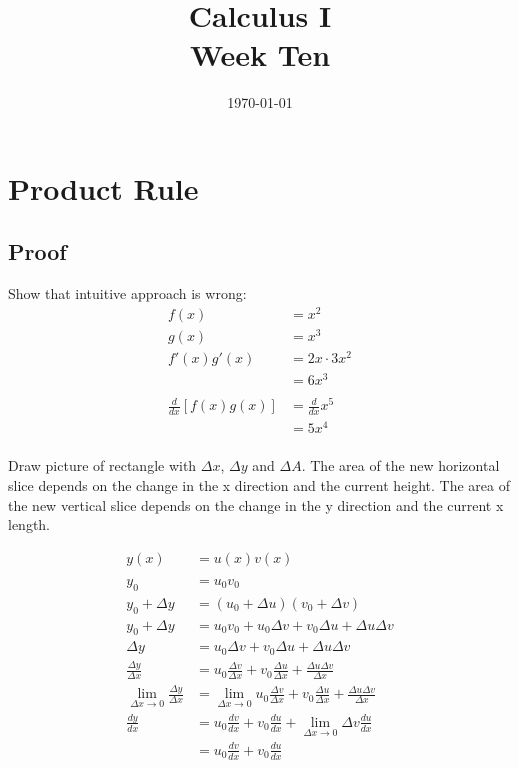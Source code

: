 \documentclass[letterpaper, landscape]{exam}
\title{Calculus I \\ Week Ten}
\author{}
\date{\today}
\begin{document}
  \maketitle
  \tableofcontents

  \section{Product Rule} %
  \label{sec:pr}
  
  \subsection{Proof} %
  \label{sub:pr.proof}
  
  Show that intuitive approach is wrong:
  \begin{align*}
    f(x)                       & = x^2 \\
    g(x)                       & = x^3 \\
    f'(x) g'(x)                & = 2x \cdot 3x^2 \\
                               & = 6x^3 \\
    \\
    \frac{d}{dx} [ f(x) g(x) ] & = \frac{d}{dx} x^5 \\
                               & = 5x^4 \\
  \end{align*}

  Draw picture of rectangle with $\Delta x$, $\Delta y$ and $\Delta A$. The area of the new
  horizontal slice depends on the change in the x direction and the current height. The area of the
  new vertical slice depends on the change in the y direction and the current x length.

  \begin{align*}
    y(x)                      & = u(x) v(x) \\
    \\
    y_0                       & = u_0 v_0 \\
    y_0 + \Delta y            & = (u_0 + \Delta u) (v_0 + \Delta v) \\
    y_0 + \Delta y            & = u_0 v_0 + u_0 \Delta v + v_0 \Delta u + \Delta u \Delta v \\
    \Delta y                  & = u_0 \Delta v + v_0 \Delta u + \Delta u \Delta v \\
    \frac{\Delta y}{\Delta x} & = u_0 \frac{\Delta v}{\Delta x} + v_0 \frac{\Delta u}{\Delta x} + \frac{\Delta u \Delta v}{\Delta x} \\
    \lim_{\Delta x \to 0} \frac{\Delta y}{\Delta x} & = \lim_{\Delta x \to 0} u_0 \frac{\Delta v}{\Delta x} 
      + v_0 \frac{\Delta u}{\Delta x} + \frac{\Delta u \Delta v}{\Delta x} \\
    \frac{dy}{dx} & = u_0 \frac{dv}{dx} + v_0 \frac{du}{dx} + \lim_{\Delta x \to 0} \Delta v \frac{du}{dx} \\
                  & = u_0 \frac{dv}{dx} + v_0 \frac{du}{dx} \\
  \end{align*}
\end{document}
